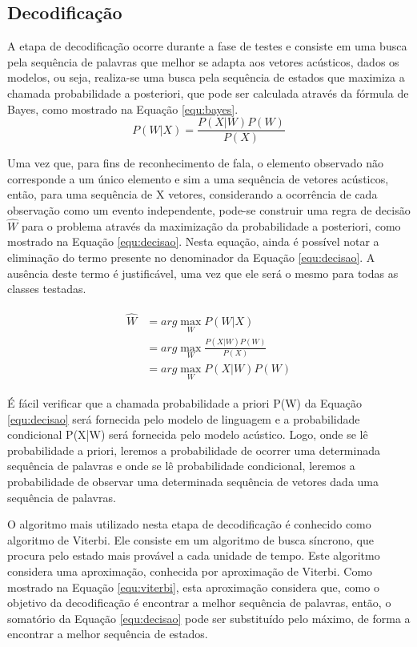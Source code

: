 \documentclass[12pt,a4paper,oneside]{report}
\begin{document}
\subsection{Decodificação}

A etapa de decodificação ocorre durante a fase de testes e consiste em uma busca pela sequência de palavras que melhor se adapta aos vetores acústicos, dados os modelos, ou seja, realiza-se uma busca pela sequência de estados que maximiza a chamada probabilidade a posteriori, que pode ser calculada através da fórmula de Bayes, como mostrado na Equação \ref{equ:bayes}.
\begin{equation}
P(W|X) = \frac{P(X|W)P(W)}{P(X)}
\label{equ:bayes}
\end{equation}

Uma vez que, para fins de reconhecimento de fala, o elemento observado não corresponde a um único elemento e sim a uma sequência de vetores acústicos, então, para uma sequência de X vetores, considerando a ocorrência de cada observação como um evento independente, pode-se construir uma regra de decisão $\widehat{W}$ para o problema através da maximização da probabilidade a posteriori, como mostrado na Equação \ref{equ:decisao}. Nesta equação, ainda é possível notar a eliminação do termo presente no denominador da Equação \ref{equ:decisao}. A ausência deste termo é justificável, uma vez que ele será o mesmo para todas as classes testadas.

\begin{align}
\begin{split}
\widehat{W} &= arg \max _{W} P(W|X) \\
&= arg \max _{W} \frac{P(X|W)P(W)}{P(X)} \\
&= arg \max _{W} P(X|W)P(W)
\end{split}
\label{equ:decisao}
\end{align}

É fácil verificar que a chamada probabilidade a priori P(W) da Equação \ref{equ:decisao} será fornecida pelo modelo de linguagem e a probabilidade condicional P(X|W) será fornecida pelo modelo acústico. Logo, onde se lê probabilidade a priori, leremos a probabilidade de ocorrer uma determinada sequência de palavras e onde se lê probabilidade condicional, leremos a probabilidade de observar uma determinada sequência de vetores dada uma sequência de palavras.

O algoritmo mais utilizado nesta etapa de decodificação é conhecido como algoritmo de Viterbi. Ele consiste em um
algoritmo de busca síncrono, que procura pelo estado mais provável a cada unidade de tempo. Este algoritmo considera uma
aproximação, conhecida por aproximação de Viterbi. Como mostrado na Equação \ref{equ:viterbi}, esta aproximação
considera que, como o objetivo da decodificação é encontrar a melhor sequência de palavras, então, o somatório da
Equação \ref{equ:decisao} pode ser substituído pelo máximo, de forma a encontrar a melhor sequência de estados.
\end{document}
